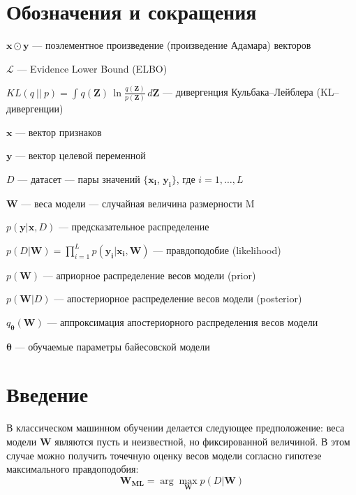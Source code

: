 \documentclass{article}
\newcommand{\argmax}{\arg\!\max}
\numberwithin{equation}{section}
\begin{document}
    \section{Обозначения и сокращения}
    $\pmb{x} \odot \pmb{y}$ --- поэлементное произведение (произведение Адамара) векторов \par
    $\mathcal{L}$ --- Evidence Lower Bound (ELBO) \par
    $
        KL(q~||~p)
        =
        \int_{}{
            q(\pmb{Z})
            \,
            \ln{
                \frac
                    {q(\pmb{Z})}
                    {p(\pmb{Z})}
            }
            \,
            d\pmb{Z}
        }
    $ --- дивергенция Кульбака--Лейблера (KL--дивергенции) \par
    $\pmb{x}$ --- вектор признаков \par
    $\pmb{y}$ --- вектор целевой переменной \par
    $D$ --- датасет --- пары значений $\{\pmb{x_i}$, $\pmb{y_i}\}$, где $i = 1, \dots, L$ \par
    $\pmb{W}$ --- веса модели --- случайная величина размерности M \par
    $p(\pmb{y} | \pmb{x}, D)$ --- предсказательное распределение \par
    $
        p(D | \pmb{W})
        =
        \prod_{i=1}^{L}{
            p(\pmb{y_i} | \pmb{x_i}, \pmb{W})
        }
    $ — правдоподобие (likelihood) \par
    $p(\pmb{W})$ --- априорное распределение весов модели (prior) \par
    $p(\pmb{W}| D)$ --- апостериорное распределение весов модели (posterior) \par
    $q_{\pmb{\theta}}(\pmb{W})$ --- аппроксимация апостериорного распределения весов модели \par
    $\pmb{\theta}$ --- обучаемые параметры байесовской модели \par

    \section{Введение}

    В классическом машинном обучении делается следующее предположение:
    веса модели $\pmb{W}$ являются пусть и неизвестной, но фиксированной величиной.
    В этом случае можно получить точечную оценку весов модели согласно гипотезе максимального правдоподобия:
    \begin{equation}
        \pmb{W_{ML}} = \argmax_{\pmb{W}} p(D | \pmb{W})
    \end{equation}
\end{document}
